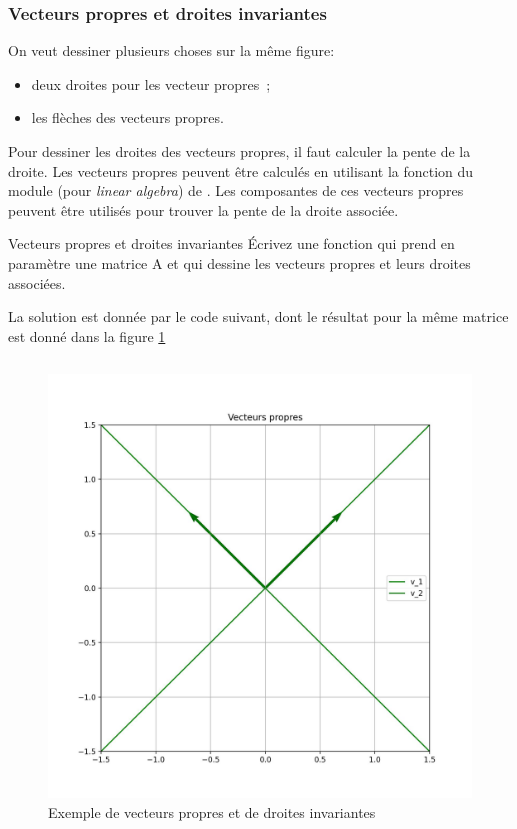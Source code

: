             \subsubsection{Vecteurs propres et droites invariantes}
                On veut dessiner plusieurs choses sur la même figure:
                \begin{itemize}
                    \item deux droites pour les vecteur propres~;
                    \item les flèches des vecteurs propres.
                \end{itemize}
                Pour dessiner les droites des vecteurs propres, il faut calculer la pente de la droite.
                Les vecteurs propres peuvent être calculés en utilisant la fonction  du module  (pour \textit{linear algebra}) de .
                Les composantes de ces vecteurs propres peuvent être utilisés pour trouver la pente de la droite associée.

                \begin{exercise}{Vecteurs propres et droites invariantes}
                    Écrivez une fonction  qui prend en paramètre une matrice A et qui dessine les vecteurs propres et leurs droites associées.
                \end{exercise}
                
                La solution est donnée par le code suivant, dont le résultat pour la même matrice est donné dans la figure \ref{fig:invariants}
                \inputminted{python}{codes/invariants.py}
                \begin{figure}[ht!]
                    \centering
                    \includegraphics[width=\textwidth]{images/invariants.jpg}
                    \caption{Exemple de vecteurs propres et de droites invariantes}
                    \label{fig:invariants}
                \end{figure}

